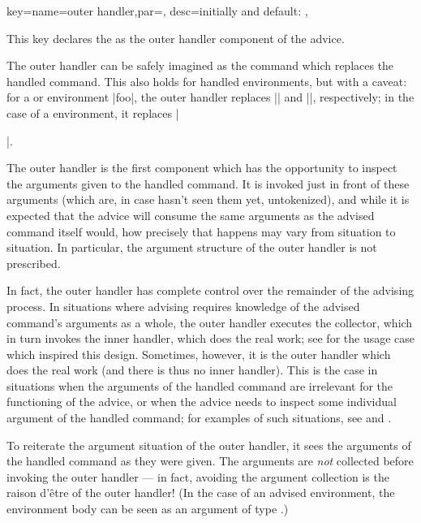 \documentclass[a4paper,11pt]{article}
\begin{document}
\begin{doc}{
    key={name=outer handler,par=,
      desc=initially and default: },
  }

  This key declares the  as the outer handler component
  of the advice.

  The outer handler can be safely imagined as the command which replaces the
  handled command.  This also holds for handled environments, but with a
  caveat: for a  or  environment |foo|, the
  outer handler replaces |\foo| and |\startfoo|, respectively; in the case of a
   environment, it replaces |\begin{foo}|.%
  
  The outer handler is the first component which has the opportunity to inspect
  the arguments given to the handled command.  It is invoked just in front of
  these arguments (which are, in case  hasn't seen them yet,
  untokenized), and while it is expected that the advice will consume
  the same arguments as the advised command itself would, how precisely that
  happens may vary from situation to situation.  In particular, the argument
  structure of the outer handler is not prescribed.
  
  In fact, the outer handler has complete control over the remainder of the
  advising process.  In situations where advising requires knowledge of the
  advised command's arguments as a whole, the outer handler executes the
  collector, which in turn invokes the inner handler, which does the real work;
  see  for the usage case which inspired this design.
  Sometimes, however, it is the outer handler which does the real work (and
  there is thus no inner handler).  This is the case in situations when the
  arguments of the handled command are irrelevant for the functioning of the
  advice, or when the advice needs to inspect some individual argument of the
  handled command; for examples of such situations, see  and
  .

  To reiterate the argument situation of the outer handler, it sees the
  arguments of the handled command as they were given.  The arguments are
  \emph{not} collected before invoking the outer handler --- in fact, avoiding
  the argument collection is the raison d'être of the outer handler!  (In the case
  of an advised environment, the environment body can be seen as an argument of
   type .)
  

\end{foo}
\end{doc}
\end{document}
